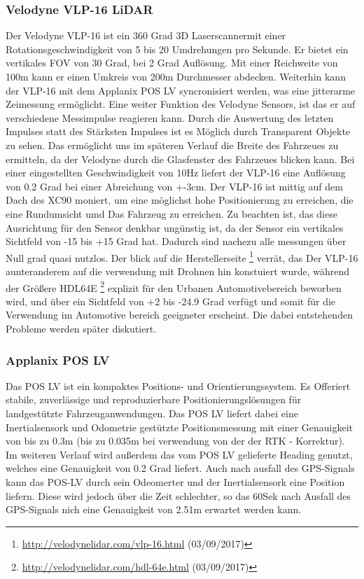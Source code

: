 \subsubsection{Velodyne VLP-16 LiDAR}
Der Velodyne VLP-16 ist ein 360 Grad 3D Laserscannermit einer Rotationsgeschwindigkeit von 5 bis 20 Umdrehungen pro Sekunde. Er bietet ein vertikales FOV von 30 Grad, bei 2 Grad Auflösung.
Mit einer Reichweite von 100m kann er einen Umkreis von 200m Durchmesser abdecken. Weiterhin kann der VLP-16 mit dem Applanix POS LV syncronisiert werden, was eine jitterarme Zeimessung ermöglicht.
Eine weiter Funktion des Velodyne Sensors, ist das er auf verschiedene Messimpulse reagieren kann. Durch die Auswertung des letzten Impulses statt des Stärksten Impulses ist es Möglich durch Transparent Objekte zu sehen.
Das ermöglicht uns im späteren Verlauf die Breite des Fahrzeues zu ermitteln, da der Velodyne durch die Glasfenster des Fahrzeues blicken kann.
Bei einer eingestellten Geschwindigkeit von 10Hz liefert der VLP-16 eine Auflösung von 0.2 Grad bei einer Abreichung von +-3cm. Der VLP-16 ist mittig auf dem Dach des XC90 moniert, um eine möglichst hohe Positionierung
zu erreichen, die eine Rundumsicht umd Das Fahrzeug zu erreichen. Zu beachten ist, das diese Ausrichtung für den Sensor denkbar ungünstig ist, da der Sensor ein vertikales
Sichtfeld von -15 bis +15 Grad hat. Dadurch sind nachezu alle messungen über Null grad quasi nutzlos. Der blick auf die Herstellerseite
\footnote{\url{http://velodynelidar.com/vlp-16.html} (03/09/2017)}
verrät, das Der VLP-16 aunteranderem auf die verwendung mit Drohnen hin konstuiert wurde, während der Größere HDL64E
\footnote{\url{http://velodynelidar.com/hdl-64e.html} (03/09/2017)}
explizit für den Urbanen Automotivebereich beworben wird, und über ein Sichtfeld von +2 bis -24.9 Grad verfügt und somit für die Verwendung im
Automotive bereich geeigneter erscheint. Die dabei entstehenden Probleme werden später diskutiert.



\subsubsection{Applanix POS LV}
Das POS LV ist ein kompaktes Positions- und Orientierungssystem. Es Offeriert stabile, zuverlässige und reproduzierbare Positionierungslösungen für landgestützte Fahrzeuganwendungen.
Das POS LV liefert dabei eine Inertialsensork und Odometrie gestützte Positionsmessung mit einer Genauigkeit von bis zu 0.3m (bis zu 0.035m bei verwendung von der der RTK - Korrektur).
Im weiteren Verlauf wird außerdem das vom POS LV gelieferte Heading genutzt, welches eine Genauigkeit von 0.2 Grad liefert. Auch nach ausfall des GPS-Signals kann das POS-LV durch sein
Odeomerter und der Inertialsensork eine Position liefern. Diese wird jedoch über die Zeit schlechter, so das 60Sek nach Ausfall des GPS-Signals nich eine Genauigkeit von 2.51m erwartet
werden kann.\cite{manAP}


